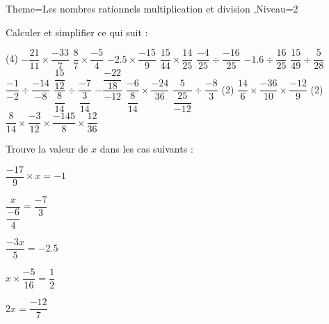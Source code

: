 \documentclass[a4paper,12pt]{article}
\begin{document}
\begin{Maquette}[Fiche]{Theme=Les nombres rationnels multiplication et division ,Niveau=2}

\begin{exercice}
Calculer et simplifier ce qui suit :
\begin{tasks}(4)
\task $-\dfrac{21}{11}\times \dfrac{-33}{7} $
\task $ \dfrac{8}{7}\times \dfrac{-5}{4}$
\task $ -2.5\times \dfrac{-15}{9}$
\task $ \dfrac{15}{44}\times \dfrac{14}{25}$     
\task $\dfrac{-4}{25}\div \dfrac{-16}{25}$
\task $ -1.6\div \dfrac{16}{25} $
\task $ \dfrac{15}{49}\div \dfrac{5}{28} $
\task $ \dfrac{-1}{-2}\div \dfrac{-14}{-8} $
\task $\dfrac{\dfrac{15}{12}}{\dfrac{8}{14}}\div \dfrac{-7}{\dfrac{3}{14}}$
\task $ -\dfrac{\dfrac{-22}{18}}{-12}$
\task $ \dfrac{-6}{\dfrac{8}{14}}\times \dfrac{-24}{36}$
\task $  \dfrac{5}{\dfrac{25}{-12}}\div \dfrac{-8}{3} $                  
\task*(2) $ \dfrac{14}{6}\times \dfrac{-36}{10}\times\dfrac{-12}{9}$
\task*(2) $ \dfrac{8}{14}\times\dfrac{-3}{12}\times\dfrac{-145}{8}\times\dfrac{12}{36}$
\end{tasks}
\end{exercice}

\begin{exercice}
Trouve la valeur de $x$ dans les cas suivants :\vspace{0.5cm}\newline
\begin{itemize*}
\item $\dfrac{-17}{9}\times x=-1$
\item $\dfrac{x}{\dfrac{-6}{4}}=\dfrac{-7}{3}$
\item $ \dfrac{-3x}{5}=-2.5 $
\item $x\times \dfrac{-5}{16}=\dfrac{1}{2}$
\item $ 2x=\dfrac{-12}{7}$
\end{itemize*}
\end{exercice}


\end{Maquette}
\end{document}
